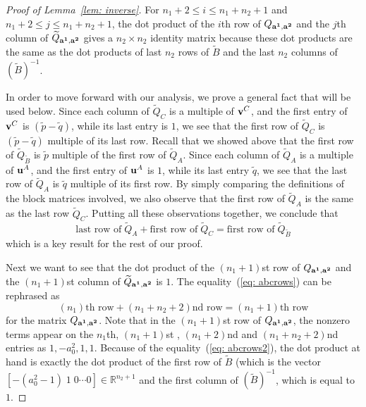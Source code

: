 \documentclass[10pt,a4paper]{amsart}
\begin{document}
\begin{proof} [Proof of Lemma~\ref{lem: inverse}]
For $n_1+2 \leq i \leq n_1+n_2+1$ and $n_1+2 \leq j \leq n_1+n_2+1$,  the dot product of the $i$th row of $Q_{{\bf a^1}, {\bf a^2}}$  and the $j$th  column of $\widetilde{Q}_{{\bf a^1}, {\bf a^2}}$ gives a $n_2 \times n_2$ identity matrix because these dot products are the same as the dot products of last $n_2$  rows of $\widetilde{B}$ and the last $n_2$ columns of  $(\widetilde{B})^{-1}$. 

In order to move forward with our analysis, we prove a general fact that will be used below. Since each column of $\widetilde{Q}_C$ is a multiple of ${\bf v}^C$, and the first entry of ${\bf v}^C$ is $(\widetilde{p}-\widetilde{q})$, while its last entry is $1$, we see that the first row of $\widetilde{Q}_C$ is $(\widetilde{p}-\widetilde{q})$ multiple of its last row. Recall that we showed above that the first  row of  $\widetilde{Q}_{\widetilde{B}}$ is $\widetilde{p}$ multiple of the first row of $\widetilde{Q}_A$. Since each column of $\widetilde{Q}_A$ is a multiple of ${\bf u}^A$, and the first entry of ${\bf u}^A$ is $1$, while its last entry $\widetilde{q}$, we see that the last row of $\widetilde{Q}_A$ is $\widetilde{q}$ multiple of its first row. By simply comparing the definitions of the block matrices involved, we also observe that the first row of $\widetilde{Q}_A$ is the same as the last row $\widetilde{Q}_C$. Putting all these observations together, we conclude that 
\begin{equation}\label{eq: abcrows}
 \mbox{last row of}\;  \widetilde{Q}_A +  \mbox{first row of}\;  \widetilde{Q}_C = \mbox{first row of}\;  \widetilde{Q}_{\widetilde{B}} 
\end{equation}
which is a key result for the rest of our proof. 

Next we want to see that the dot product of the $(n_1+1)$st row of $Q_{{\bf a^1}, {\bf a^2}}$ and the  $(n_1+1)$st  column of $\widetilde{Q}_{{\bf a^1}, {\bf a^2}}$ is $1$. The equality~(\ref{eq: abcrows}) can be rephrased as 
\begin{equation}\label{eq: abcrows2}
(n_1)\mbox{th row} + (n_1+n_2+2)\mbox{nd row} = (n_1+1)\mbox{th row} 
\end{equation}
for the matrix $Q_{{\bf a^1}, {\bf a^2}}$. Note that  in the  $(n_1+1)$st  row of $Q_{{\bf a^1}, {\bf a^2}}$, the nonzero terms appear on the $n_1$th,  $(n_1+1)$st , $(n_1+2)$nd and $(n_1+n_2+2)$nd entries as $1,-a_0^2,1,1$. Because of the equality~(\ref{eq: abcrows2}),   the dot product at hand is exactly the dot product of the first row of $\widetilde{B}$ (which is the vector $[-(a_0^2-1) \; 1 \; 0 \cdots 0] \in \mathbb{R}^{n_2+1}$ and the first column of $(\widetilde{B})^{-1}$, which is equal to $1$. 


\end{proof}
\end{document}
